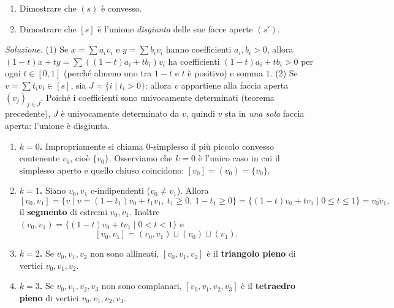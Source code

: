 \begin{ejercicio*}
\begin{enumerate}
    \item Dimostrare che $(s)$ \`e convesso.
    \item Dimostrare che $[s]$ \`e l'unione \emph{disgiunta} delle sue facce aperte $(s')$.
\end{enumerate}
\end{ejercicio*}
\textit{Soluzione.} (1) Se $x = \sum a_i v_i$ e $y = \sum b_i v_i$ hanno coefficienti $a_i, b_i > 0$, allora $(1-t)x + ty = \sum ((1-t)a_i + t b_i) v_i$ ha coefficienti $(1-t)a_i + t b_i > 0$ per ogni $t \in [0,1]$ (perch\'e almeno uno tra $1-t$ e $t$ \`e positivo) e somma $1$.
(2) Se $v = \sum t_i v_i \in [s]$, sia $J = \{ i \mid t_i > 0 \}$: allora $v$ appartiene alla faccia aperta $(v_j)_{j \in J}$. Poich\'e i coefficienti sono univocamente determinati (teorema precedente), $J$ \`e univocamente determinato da $v$, quindi $v$ sta in \emph{una sola} faccia aperta: l'unione \`e disgiunta.

\begin{ejemplo}
\begin{enumerate}
    \item \textbf{$k = 0$.} Impropriamente si chiama $0$-simplesso il pi\`u piccolo convesso contenente $v_0$, cio\`e $\{v_0\}$. Osserviamo che $k = 0$ \`e l'unico caso in cui il simplesso aperto e quello chiuso coincidono: $[v_0] = (v_0) = \{v_0\}$.
    \item \textbf{$k = 1$.} Siano $v_0, v_1$ c-indipendenti ($v_0 \neq v_1$). Allora
    \[
    [v_0, v_1] = \{ v \mid v = (1-t_1)v_0 + t_1 v_1,\ t_1 \geqslant 0,\ 1 - t_1 \geqslant 0 \} = \{ (1-t)v_0 + t v_1 \mid 0 \leqslant t \leqslant 1 \} = \overline{v_0 v_1},
    \]
    il \textbf{segmento} di estremi $v_0, v_1$. Inoltre $(v_0, v_1) = \{ (1-t)v_0 + t v_1 \mid 0 < t < 1 \}$ e
    \[
    [v_0, v_1] = (v_0, v_1) \sqcup (v_0) \sqcup (v_1).
    \]
    \item \textbf{$k = 2$.} Se $v_0, v_1, v_2$ non sono allineati, $[v_0, v_1, v_2]$ \`e il \textbf{triangolo pieno} di vertici $v_0, v_1, v_2$.
    \item \textbf{$k = 3$.} Se $v_0, v_1, v_2, v_3$ non sono complanari, $[v_0, v_1, v_2, v_3]$ \`e il \textbf{tetraedro pieno} di vertici $v_0, v_1, v_2, v_3$.
\end{enumerate}
\end{ejemplo}

